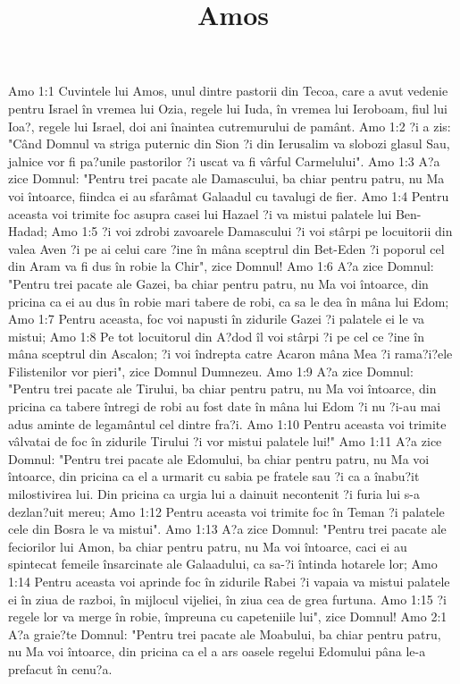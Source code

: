 

\title{Amos}

Amo 1:1  Cuvintele lui Amos, unul dintre pastorii din Tecoa, care a avut vedenie pentru Israel în vremea lui Ozia, regele lui Iuda, în vremea lui Ieroboam, fiul lui Ioa?, regele lui Israel, doi ani înaintea cutremurului de pamânt.
Amo 1:2  ?i a zis: "Când Domnul va striga puternic din Sion ?i din Ierusalim va slobozi glasul Sau, jalnice vor fi pa?unile pastorilor ?i uscat va fi vârful Carmelului".
Amo 1:3  A?a zice Domnul: "Pentru trei pacate ale Damascului, ba chiar pentru patru, nu Ma voi întoarce, fiindca ei au sfarâmat Galaadul cu tavalugi de fier.
Amo 1:4  Pentru aceasta voi trimite foc asupra casei lui Hazael ?i va mistui palatele lui Ben-Hadad;
Amo 1:5  ?i voi zdrobi zavoarele Damascului ?i voi stârpi pe locuitorii din valea Aven ?i pe ai celui care ?ine în mâna sceptrul din Bet-Eden ?i poporul cel din Aram va fi dus în robie la Chir", zice Domnul!
Amo 1:6  A?a zice Domnul: "Pentru trei pacate ale Gazei, ba chiar pentru patru, nu Ma voi întoarce, din pricina ca ei au dus în robie mari tabere de robi, ca sa le dea în mâna lui Edom;
Amo 1:7  Pentru aceasta, foc voi napusti în zidurile Gazei ?i palatele ei le va mistui;
Amo 1:8  Pe tot locuitorul din A?dod îl voi stârpi ?i pe cel ce ?ine în mâna sceptrul din Ascalon; ?i voi îndrepta catre Acaron mâna Mea ?i rama?i?ele Filistenilor vor pieri", zice Domnul Dumnezeu.
Amo 1:9  A?a zice Domnul: "Pentru trei pacate ale Tirului, ba chiar pentru patru, nu Ma voi întoarce, din pricina ca tabere întregi de robi au fost date în mâna lui Edom ?i nu ?i-au mai adus aminte de legamântul cel dintre fra?i.
Amo 1:10  Pentru aceasta voi trimite vâlvatai de foc în zidurile Tirului ?i vor mistui palatele lui!"
Amo 1:11  A?a zice Domnul: "Pentru trei pacate ale Edomului, ba chiar pentru patru, nu Ma voi întoarce, din pricina ca el a urmarit cu sabia pe fratele sau ?i ca a înabu?it milostivirea lui. Din pricina ca urgia lui a dainuit necontenit ?i furia lui s-a dezlan?uit mereu;
Amo 1:12  Pentru aceasta voi trimite foc în Teman ?i palatele cele din Bosra le va mistui".
Amo 1:13  A?a zice Domnul: "Pentru trei pacate ale feciorilor lui Amon, ba chiar pentru patru, nu Ma voi întoarce, caci ei au spintecat femeile însarcinate ale Galaadului, ca sa-?i întinda hotarele lor;
Amo 1:14  Pentru aceasta voi aprinde foc în zidurile Rabei ?i vapaia va mistui palatele ei în ziua de razboi, în mijlocul vijeliei, în ziua cea de grea furtuna.
Amo 1:15  ?i regele lor va merge în robie, împreuna cu capeteniile lui", zice Domnul!
Amo 2:1  A?a graie?te Domnul: "Pentru trei pacate ale Moabului, ba chiar pentru patru, nu Ma voi întoarce, din pricina ca el a ars oasele regelui Edomului pâna le-a prefacut în cenu?a.

